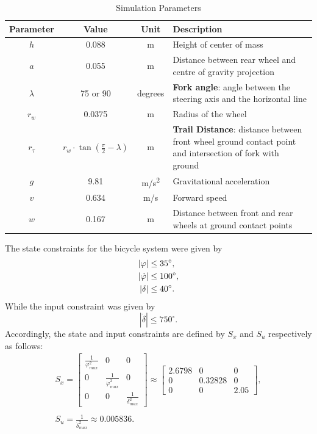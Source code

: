 \begin{table}[H]
	\centering
	\begin{tabular}{|c|c|c|p{6cm}|}
		\hline
		\textbf{Parameter} & \textbf{Value} & \textbf{Unit} & \textbf{Description} \\ \hline
		$h$ & 0.088 & m & Height of center of mass \\ \hline
		$a$ & 0.055 & m & Distance between rear wheel and centre of gravity projection \\ \hline
		$\lambda$ & 75 or 90 & degrees & \textbf{Fork angle}: angle between the steering axis and the horizontal line  \\ \hline
		$r_w$ & 0.0375 & m & Radius of the wheel \\ \hline
		$r_\tau$ & $r_w \cdot \tan\left(\frac{\pi}{2} - \lambda\right)$ & m & \textbf{Trail Distance}: distance between front wheel ground contact point and intersection of fork with ground \\ \hline
		$g$ & 9.81 & m/s\textsuperscript{2} & Gravitational acceleration \\ \hline
		$v$ & 0.634 & m/s & Forward speed \\ \hline
		$w$ & 0.167 & m & Distance between front and rear wheels at ground contact points \\ \hline
	\end{tabular}
	\caption{Simulation Parameters}
	\label{tab:simulation_parameters}
\end{table}

The state constraints for the bicycle system were given by
\begin{align}
	|\varphi| &\leq 35^\circ, \notag \\
	|\dot{\varphi}| &\leq 100^\circ, \notag \\
	|\delta| &\leq 40^\circ. \notag
\end{align}
While the input constraint was given by
\[
|\dot{\delta}| \leq 750^\circ.
\]
%
Accordingly, the state and input constraints are defined by $S_x$ and $S_u$ respectively as follows:
\begin{gather}
	\nonumber
	S_x =
	\begin{bmatrix}
		\frac{1}{\varphi_{max}^2} & 0 & 0 \\
		0 & \frac{1}{\dot{\varphi}_{max}^2} & 0 \\
		0 & 0 & \frac{1}{\delta_{max}^2}
	\end{bmatrix} \approx
	\begin{bmatrix}
		2.6798 & 0 & 0 \\
		0 & 0.32828 & 0 \\
		0 & 0 & 2.05
	\end{bmatrix},
	\\ \nonumber
	\\ \nonumber
	S_u = \frac{1}{\dot{\delta}_{max}^2} \approx 0.005836.
\end{gather}

